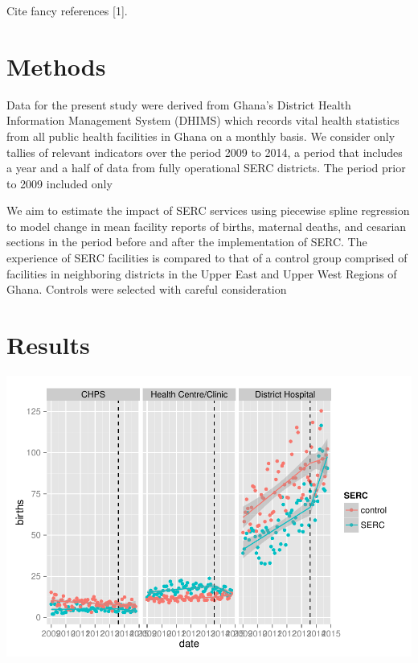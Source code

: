 \documentclass[10pt]{article}
\newenvironment{CodeChunk}{}{}
\begin{document}
Cite fancy references {[}1{]}.

\section*{Methods}\label{methods}

Data for the present study were derived from Ghana's District Health
Information Management System (DHIMS) which records vital health
statistics from all public health facilities in Ghana on a monthly
basis. We consider only tallies of relevant indicators over the period
2009 to 2014, a period that includes a year and a half of data from
fully operational SERC districts. The period prior to 2009 included only

We aim to estimate the impact of SERC services using piecewise spline
regression to model change in mean facility reports of births, maternal
deaths, and cesarian sections in the period before and after the
implementation of SERC. The experience of SERC facilities is compared to
that of a control group comprised of facilities in neighboring districts
in the Upper East and Upper West Regions of Ghana. Controls were
selected with careful consideration

\section*{Results}\label{results}

\begin{CodeChunk}

\includegraphics{serc_evaluation_files/figure-latex/unnamed-chunk-2-1} \end{CodeChunk}
\end{document}
